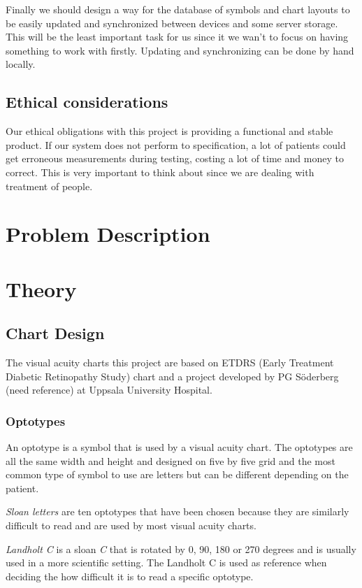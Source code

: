 \documentclass[12pt,a4paper,notitlepage]{report}
\begin{document}
Finally we should design a way for the database of symbols and chart layouts to be easily updated and synchronized between devices and some server storage. This will be the least important task for us since it we wan't to focus on having something to work with firstly. Updating and synchronizing can be done by hand locally.

\section{Ethical considerations} %
Our ethical obligations with this project is providing a functional and stable product. If our system does not perform to specification, a lot of patients could get erroneous measurements during testing, costing a lot of time and money to correct. This is very important to think about since we are dealing with treatment of people.

\chapter{Problem Description}

\chapter{Theory}
\section{Chart Design}
The visual acuity charts this project are based on ETDRS (Early Treatment Diabetic Retinopathy Study) chart\cite{Ferris} and a project developed by PG Söderberg (need reference) at Uppsala University Hospital. 

\subsection{Optotypes}
An optotype is a symbol that is used by a visual acuity chart. The optotypes are all the same width and height and designed on five by five grid and the most common type of symbol to use are letters but can be different depending on the patient\cite{Colenbrander}.

\textit{Sloan letters} are ten optotypes that have been chosen because they are similarly difficult to read\cite{Ferris} and are used by most visual acuity charts\cite{Colenbrander}.

\textit{Landholt C} is a sloan \textit{C} that is rotated by 0, 90, 180 or 270 degrees and is usually used in a more scientific setting. The Landholt C is used as reference when deciding the how difficult it is to read a specific optotype\cite{Colenbrander}.
\end{document}
